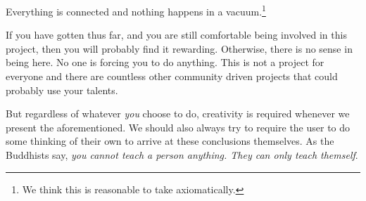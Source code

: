 \item
Everything is connected and nothing happens in a vacuum.\footnote{We think this is reasonable to take axiomatically.}
\stopitemize

If you have gotten thus far, and you are still comfortable being involved in this project, then you will probably find it rewarding. Otherwise, there is no sense in being here. No one is forcing you to do anything. This is not a project for everyone and there are countless other community driven projects that could probably use your talents.

But regardless of whatever {\it you} choose to do, creativity is required whenever we present the aforementioned. We should also always try to require the user to do some thinking of their own to arrive at these conclusions themselves. As the Buddhists say, {\it you cannot teach a person anything. They can only teach themself}.

\StopChapter

